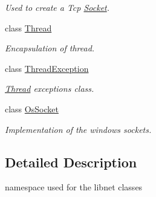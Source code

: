 \begin{DoxyCompactItemize}
\begin{DoxyCompactList}\small\item\em Used to create a Tcp \hyperlink{classmognetwork_1_1_socket}{Socket}. \end{DoxyCompactList}\item 
class \hyperlink{classmognetwork_1_1_thread}{Thread}
\begin{DoxyCompactList}\small\item\em Encapsulation of thread. \end{DoxyCompactList}\item 
class \hyperlink{classmognetwork_1_1_thread_exception}{Thread\-Exception}
\begin{DoxyCompactList}\small\item\em \hyperlink{classmognetwork_1_1_thread}{Thread} exceptions class. \end{DoxyCompactList}\item 
class \hyperlink{classmognetwork_1_1_os_socket}{Os\-Socket}
\begin{DoxyCompactList}\small\item\em Implementation of the windows sockets. \end{DoxyCompactList}\end{DoxyCompactItemize}


\subsection{Detailed Description}
namespace used for the libnet classes 